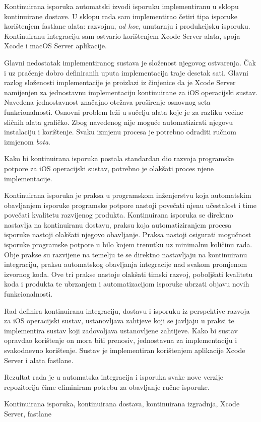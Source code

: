 \documentclass[times, utf8, diplomski, numeric]{fer}
\begin{document}
Kontinuirana isporuka automatski izvodi isporuku implementiranu u sklopu kontinuirane dostave. U sklopu rada sam implementirao četiri tipa isporuke korištenjem fastlane alata: razvojnu, \textit{ad hoc}, unutarnju i produkcijsku isporuku. Kontinuiranu integraciju sam ostvario korištenjem Xcode Server alata, spoja Xcode i macOS Server aplikacije.

Glavni nedostatak implementiranog sustava je složenost njegovog ostvarenja. Čak i uz pračenje dobro definiranih uputa implementacija traje desetak sati. Glavni razlog složenosti implementacije je proizlazi iz činjenice da je Xcode Server namijenjen za jednostavnu implementaciju kontinuirane za iOS operacijski sustav. Navedena jednostavnost značajno otežava proširenje osnovnog seta funkcionalnosti. Osnovni problem leži u sučelju alata koje je za razliku većine sličnih alata grafičko. Zbog navedenog nije moguće automatizirati njegovu instalaciju i korištenje. Svaku izmjenu procesa je potrebno odraditi ručnom izmjenom \textit{bota}.

Kako bi kontinuirana isporuka postala standardan dio razvoja programske potpore za iOS operacijski sustav, potrebno je olakšati proces njene implementacije.







\begin{sazetak}

Kontinuirana isporuka je praksa u programskom inženjerstvu koja automatskim obavljanjem isporuke programske potpore nastoji povečati njenu učestalost i time povečati kvalitetu razvijenog produkta. Kontinuirana isporuka se direktno nastavlja na kontinuiranu dostavu, praksu koja automatiziranjem procesa isporuke nastoji olakšati njegovo obavljanje. Praksa nastoji osigurati mogučnost isporuke programske potpore u bilo kojem trenutku uz minimalnu količinu rada. Obje prakse su razvijene na temelju te se direktno nastavljaju na kontinuiranu integraciju, praksu automatskog obavljanja integracije nad svakom promjenom izvornog koda. Ove tri prakse nastoje olakšati timski razvoj, poboljšati kvalitetu koda i produkta te ubrzanjem i automatizacijom isporuke ubrzati objavu novih funkcionalnosti.

Rad definira kontinuiranu integraciju, dostavu i isporuku iz perspektive razvoja za iOS operacijski sustav, ustanovljava zahtjeve koji se javljaju u praksi te implementira sustav koji zadovoljava ustanovljene zahtijeve. Kako bi sustav opravdao korištenje on mora biti prenosiv, jednostavna za implementaciju i svakodnevno korištenje. Sustav je implementiran korištenjem aplikacije Xcode Server i alata fastlane.

Rezultat rada je u automatska integracija i isporuka svake nove verzije repozitorija čime eliminiram potrebu za obavljanje ručne isporuke.


Kontinuirana isporuka, kontinuirana dostava, kontinuirana izgradnja, Xcode Server, fastlane

\end{sazetak}
\end{document}
